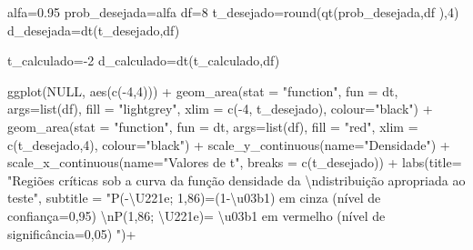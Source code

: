 \documentclass[
]{book}
\newenvironment{Shaded}{\begin{snugshade}}{\end{snugshade}}
\newcommand{\AttributeTok}[1]{\textcolor[rgb]{0.77,0.63,0.00}{#1}}
\newcommand{\ConstantTok}[1]{\textcolor[rgb]{0.00,0.00,0.00}{#1}}
\newcommand{\DecValTok}[1]{\textcolor[rgb]{0.00,0.00,0.81}{#1}}
\newcommand{\FloatTok}[1]{\textcolor[rgb]{0.00,0.00,0.81}{#1}}
\newcommand{\FunctionTok}[1]{\textcolor[rgb]{0.00,0.00,0.00}{#1}}
\newcommand{\NormalTok}[1]{#1}
\newcommand{\OtherTok}[1]{\textcolor[rgb]{0.56,0.35,0.01}{#1}}
\newcommand{\SpecialCharTok}[1]{\textcolor[rgb]{0.00,0.00,0.00}{#1}}
\newcommand{\StringTok}[1]{\textcolor[rgb]{0.31,0.60,0.02}{#1}}
\begin{document}
\begin{Shaded}
\begin{Highlighting}[]
\NormalTok{alfa}\OtherTok{=}\FloatTok{0.95}
\NormalTok{prob\_desejada}\OtherTok{=}\NormalTok{alfa}
\NormalTok{df}\OtherTok{=}\DecValTok{8}
\NormalTok{t\_desejado}\OtherTok{=}\FunctionTok{round}\NormalTok{(}\FunctionTok{qt}\NormalTok{(prob\_desejada,df ),}\DecValTok{4}\NormalTok{)}
\NormalTok{d\_desejada}\OtherTok{=}\FunctionTok{dt}\NormalTok{(t\_desejado,df)}

\NormalTok{t\_calculado}\OtherTok{=}\SpecialCharTok{{-}}\DecValTok{2}
\NormalTok{d\_calculado}\OtherTok{=}\FunctionTok{dt}\NormalTok{(t\_calculado,df)}


\FunctionTok{ggplot}\NormalTok{(}\ConstantTok{NULL}\NormalTok{, }\FunctionTok{aes}\NormalTok{(}\FunctionTok{c}\NormalTok{(}\SpecialCharTok{{-}}\DecValTok{4}\NormalTok{,}\DecValTok{4}\NormalTok{))) }\SpecialCharTok{+}
  \FunctionTok{geom\_area}\NormalTok{(}\AttributeTok{stat =} \StringTok{"function"}\NormalTok{, }
            \AttributeTok{fun =}\NormalTok{ dt,}
            \AttributeTok{args=}\FunctionTok{list}\NormalTok{(df), }
            \AttributeTok{fill =} \StringTok{"lightgrey"}\NormalTok{, }
            \AttributeTok{xlim =} \FunctionTok{c}\NormalTok{(}\SpecialCharTok{{-}}\DecValTok{4}\NormalTok{, t\_desejado),}
            \AttributeTok{colour=}\StringTok{"black"}\NormalTok{) }\SpecialCharTok{+}
  \FunctionTok{geom\_area}\NormalTok{(}\AttributeTok{stat =} \StringTok{"function"}\NormalTok{, }
            \AttributeTok{fun =}\NormalTok{ dt, }
            \AttributeTok{args=}\FunctionTok{list}\NormalTok{(df), }
            \AttributeTok{fill =} \StringTok{"red"}\NormalTok{, }
            \AttributeTok{xlim =} \FunctionTok{c}\NormalTok{(t\_desejado,}\DecValTok{4}\NormalTok{),}
            \AttributeTok{colour=}\StringTok{"black"}\NormalTok{) }\SpecialCharTok{+}
  \FunctionTok{scale\_y\_continuous}\NormalTok{(}\AttributeTok{name=}\StringTok{"Densidade"}\NormalTok{) }\SpecialCharTok{+}
  \FunctionTok{scale\_x\_continuous}\NormalTok{(}\AttributeTok{name=}\StringTok{"Valores de t"}\NormalTok{, }\AttributeTok{breaks =} \FunctionTok{c}\NormalTok{(t\_desejado))  }\SpecialCharTok{+}
  \FunctionTok{labs}\NormalTok{(}\AttributeTok{title=} 
         \StringTok{"Regiões críticas sob a curva da função densidade da }\SpecialCharTok{\textbackslash{}n}\StringTok{distribuição apropriada ao teste"}\NormalTok{, }
       \AttributeTok{subtitle =} \StringTok{"P({-}\textbackslash{}U221e; 1,86)=(1{-}\textbackslash{}u03b1) em cinza (nível de confiança=0,95) }\SpecialCharTok{\textbackslash{}n}\StringTok{P(1,86; \textbackslash{}U221e)= \textbackslash{}u03b1 em vermelho (nível de significância=0,05) "}\NormalTok{)}\SpecialCharTok{+} 

\end{Highlighting}
\end{Shaded}
\end{document}
